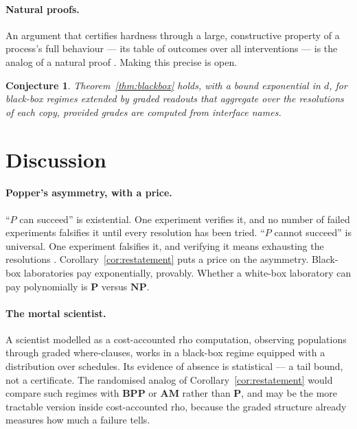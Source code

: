 \documentclass[11pt]{article}
\theoremstyle{definition}
\theoremstyle{plain}
\newtheorem{conjecture}[definition]{Conjecture}
\theoremstyle{remark}
\newcommand{\Pclass}{\mathbf{P}}
\newcommand{\NPclass}{\mathbf{NP}}
\begin{document}
\paragraph{Natural proofs.} An argument that certifies hardness through a
large, constructive property of a process's full behaviour --- its table
of outcomes over all interventions --- is the analog of a natural proof
\cite{RazborovRudich97}. Making this precise is open.

\begin{conjecture}\label{conj:algebrise}
Theorem~\ref{thm:blackbox} holds, with a bound exponential in $d$, for
black-box regimes extended by graded readouts that aggregate over the
resolutions of each copy, provided grades are computed from interface
names.
\end{conjecture}

\section{Discussion}\label{sec:discussion}

\paragraph{Popper's asymmetry, with a price.} ``$P$ can succeed'' is
existential. One experiment verifies it, and no number of failed
experiments falsifies it until every resolution has been tried. ``$P$
cannot succeed'' is universal. One experiment falsifies it, and verifying
it means exhausting the resolutions \cite{Popper59}.
Corollary~\ref{cor:restatement} puts a price on the asymmetry. Black-box
laboratories pay exponentially, provably. Whether a white-box laboratory
can pay polynomially is $\Pclass$ versus $\NPclass$.

\paragraph{The mortal scientist.} A scientist modelled as a
cost-accounted rho computation, observing populations through graded
where-clauses, works in a black-box regime equipped with a distribution
over schedules. Its evidence of absence is statistical --- a tail bound,
not a certificate. The randomised analog of
Corollary~\ref{cor:restatement} would compare such regimes with
$\mathbf{BPP}$ or $\mathbf{AM}$ rather than $\Pclass$, and may be the more
tractable version inside cost-accounted rho, because the graded structure
already measures how much a failure tells.
\end{document}
